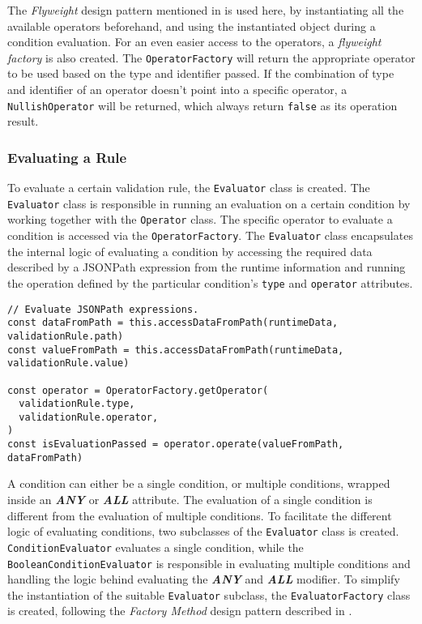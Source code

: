       The \emph{Flyweight} design pattern mentioned in \autocite[pp. 195-206]{gamma-1995} is used here, by instantiating all the available operators beforehand, and using the instantiated object during a condition evaluation. For an even easier access to the operators, a \emph{flyweight factory} is also created. The \verb;OperatorFactory; will return the appropriate operator to be used based on the type and identifier passed. If the combination of type and identifier of an operator doesn't point into a specific operator, a \verb;NullishOperator; will be returned, which always return \verb;false; as its operation result. 

    \subsubsection{Evaluating a Rule} 
      
      To evaluate a certain validation rule, the \verb;Evaluator; class is created. The \verb;Evaluator; class is responsible in running an evaluation on a certain condition by working together with the \verb;Operator; class. The specific operator to evaluate a condition is accessed via the \verb;OperatorFactory;. The \verb;Evaluator; class encapsulates the internal logic of evaluating a condition by accessing the required data described by a JSONPath expression from the runtime information and running the operation defined by the particular condition's \verb;type; and \verb;operator; attributes. 

      \begin{lstlisting}[style=es6, caption={The usage of OperatorFactory class in the Evaluator class (TypeScript)}]
// Evaluate JSONPath expressions.
const dataFromPath = this.accessDataFromPath(runtimeData, validationRule.path)
const valueFromPath = this.accessDataFromPath(runtimeData, validationRule.value)
        
const operator = OperatorFactory.getOperator(
  validationRule.type,
  validationRule.operator,
)
const isEvaluationPassed = operator.operate(valueFromPath, dataFromPath)
      \end{lstlisting}
      
      A condition can either be a single condition, or multiple conditions, wrapped inside an \textbf{\emph{ANY}} or \textbf{\emph{ALL}} attribute. The evaluation of a single condition is different from the evaluation of multiple conditions. To facilitate the different logic of evaluating conditions, two subclasses of the \verb;Evaluator; class is created. \verb;ConditionEvaluator; evaluates a single condition, while the \verb;BooleanConditionEvaluator; is responsible in evaluating multiple conditions and handling the logic behind evaluating the \textbf{\emph{ANY}} and \textbf{\emph{ALL}} modifier. To simplify the instantiation of the suitable \verb;Evaluator; subclass, the \verb;EvaluatorFactory; class is created, following the \emph{Factory Method} design pattern described in \autocite[pp. 107-116]{gamma-1995}. 

